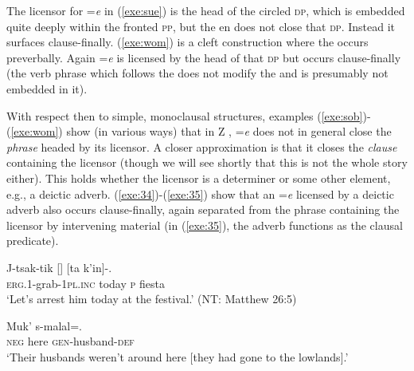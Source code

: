 \documentclass[output=paper,
modfonts
]{LSP/langsci}
\begin{document}
\vspace*{2ex}
The  licensor for =\emph{e} in (\ref{exe:sue}) is the head of the circled \textsc{dp}, which is embedded quite deeply within the fronted \textsc{pp}, but the en  does not close that \textsc{dp}. Instead it surfaces clause-finally.
 (\ref{exe:wom}) is a cleft construction where the  occurs preverbally. Again =\emph{e} is licensed by
the head of that \textsc{dp} but occurs clause-finally (the verb phrase which follows the  does not modify the  and is presumably not embedded in it).

With respect then to simple, monoclausal structures, 
examples (\ref{exe:sob})-(\ref{exe:wom}) show (in various ways) that in Z , =\emph{e} does not in general 
close the \emph{phrase} headed by its licensor. A closer approximation is that it closes the \emph{clause} 
containing the licensor (though we will see shortly that this is not the whole story either). 
This holds whether the licensor is a determiner or some other element, e.g., a deictic adverb.  
(\ref{exe:34})-(\ref{exe:35}) show that an =\emph{e} licensed by 
a deictic adverb also occurs clause-finally, again separated from the phrase containing the licensor by intervening material (in (\ref{exe:35}),
the adverb functions as the clausal predicate).
\begin{exe}
\ex\label{exe:34}\bridgeoverex
\gll J-tsak-tik []  [ta k'in]-. \\
\textsc{erg.1}-grab-\textsc{1pl.inc} today \textsc{p} fiesta \\
\glt `Let's arrest him today at the festival.' (NT: Matthew 26:5)
\end{exe}
\begin{exe}
\ex\label{exe:35}\bridgeoverex
\gll Muk'   s-malal=. \\
\textsc{neg} here \textsc{gen}-husband-\textsc{def} \\
\glt `Their husbands weren't around here [they had gone to the lowlands].' \citep[101]{laughlin1977}
\end{exe}
\end{document}
